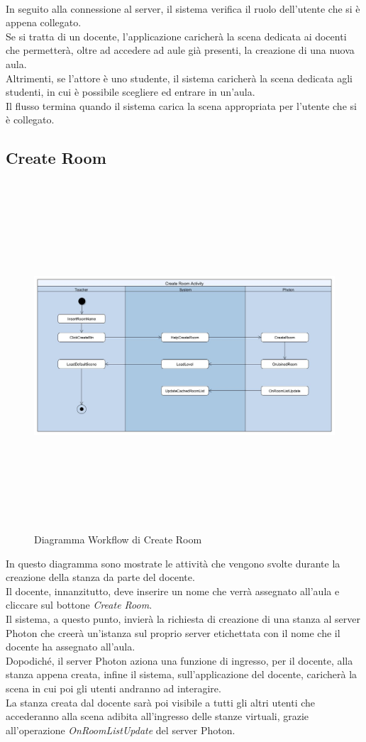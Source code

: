 \\In seguito alla connessione al server, il sistema verifica il ruolo dell'utente che si è appena collegato. 
\\Se si tratta di un docente, l'applicazione caricherà la scena dedicata ai docenti che permetterà, oltre ad accedere ad aule già presenti, la creazione di una nuova aula. 
\\Altrimenti, se l'attore è uno studente, il sistema caricherà la scena dedicata agli studenti, in cui è possibile scegliere ed entrare in un'aula.
\\Il flusso termina quando il sistema carica la scena appropriata per l'utente che si è collegato.
\subsection{Create Room}
\begin{figure}[H]
    \centering
    \includegraphics[width = 17cm, height = 13cm]{Immagini/CreateRoomActivityDiagram.jpg}
    \caption{Diagramma Workflow di Create Room}
    \label{fig:my_label}
\end{figure} 
In questo diagramma sono mostrate le attività che vengono svolte durante la creazione della stanza da parte del docente.
\\Il docente, innanzitutto, deve inserire un nome che verrà assegnato all'aula e cliccare sul bottone \textit{Create Room}.
\\Il sistema, a questo punto, invierà la richiesta di creazione di una stanza al server Photon che creerà un'istanza sul proprio server etichettata con il nome che il docente ha assegnato all'aula.
\\Dopodiché, il server Photon aziona una funzione di ingresso, per il docente, alla stanza appena creata, infine il sistema, sull'applicazione del docente, caricherà la scena in cui poi gli utenti andranno ad interagire.
\\La stanza creata dal docente sarà poi visibile a tutti gli altri utenti che accederanno alla scena adibita all'ingresso delle stanze virtuali, grazie all'operazione \textit{OnRoomListUpdate} del server Photon.

